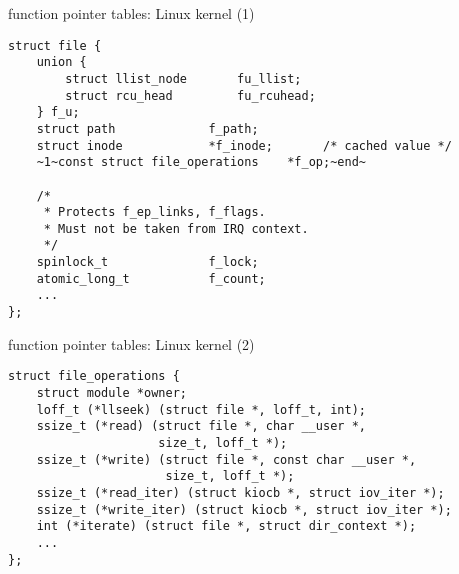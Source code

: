 
\begin{frame}[fragile,label=kernelFTbl]{function pointer tables: Linux kernel (1)}
\begin{lstlisting}
struct file {
    union {
        struct llist_node       fu_llist;
        struct rcu_head         fu_rcuhead;
    } f_u;
    struct path             f_path;
    struct inode            *f_inode;       /* cached value */
    ~1~const struct file_operations    *f_op;~end~

    /*
     * Protects f_ep_links, f_flags.
     * Must not be taken from IRQ context.
     */
    spinlock_t              f_lock;
    atomic_long_t           f_count;
    ...
};
\end{lstlisting}
\end{frame}

\begin{frame}[fragile,label=kernelFTbl2]{function pointer tables: Linux kernel (2)}
\begin{lstlisting}
struct file_operations {
    struct module *owner;
    loff_t (*llseek) (struct file *, loff_t, int);
    ssize_t (*read) (struct file *, char __user *,
                     size_t, loff_t *);
    ssize_t (*write) (struct file *, const char __user *,
                      size_t, loff_t *);
    ssize_t (*read_iter) (struct kiocb *, struct iov_iter *);
    ssize_t (*write_iter) (struct kiocb *, struct iov_iter *);
    int (*iterate) (struct file *, struct dir_context *);
    ...
};
\end{lstlisting}
\end{frame}

